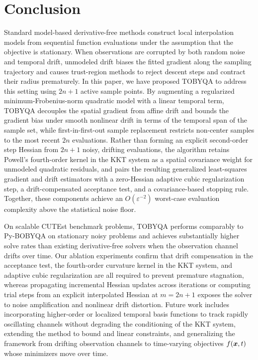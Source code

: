 \section{Conclusion}
\label{sec:conclusion}

Standard model-based derivative-free methods construct local interpolation models from sequential function evaluations under the assumption that the objective is stationary. When observations are corrupted by both random noise and temporal drift, unmodeled drift biases the fitted gradient along the sampling trajectory and causes trust-region methods to reject descent steps and contract their radius prematurely. In this paper, we have proposed TOBYQA to address this setting using $2n+1$ active sample points. By augmenting a regularized minimum-Frobenius-norm quadratic model with a linear temporal term, TOBYQA decouples the spatial gradient from affine drift and bounds the gradient bias under smooth nonlinear drift in terms of the temporal span of the sample set, while first-in-first-out sample replacement restricts non-center samples to the most recent $2n$ evaluations. Rather than forming an explicit second-order step Hessian from $2n+1$ noisy, drifting evaluations, the algorithm retains Powell's fourth-order kernel in the KKT system as a spatial covariance weight for unmodeled quadratic residuals, and pairs the resulting generalized least-squares gradient and drift estimators with a zero-Hessian adaptive cubic regularization step, a drift-compensated acceptance test, and a covariance-based stopping rule. Together, these components achieve an $O(\varepsilon^{-2})$ worst-case evaluation complexity above the statistical noise floor.

On scalable CUTEst benchmark problems, TOBYQA performs comparably to Py-BOBYQA on stationary noisy problems and achieves substantially higher solve rates than existing derivative-free solvers when the observation channel drifts over time. Our ablation experiments confirm that drift compensation in the acceptance test, the fourth-order curvature kernel in the KKT system, and adaptive cubic regularization are all required to prevent premature stagnation, whereas propagating incremental Hessian updates across iterations or computing trial steps from an explicit interpolated Hessian at $m = 2n+1$ exposes the solver to noise amplification and nonlinear drift distortion. Future work includes incorporating higher-order or localized temporal basis functions to track rapidly oscillating channels without degrading the conditioning of the KKT system, extending the method to bound and linear constraints, and generalizing the framework from drifting observation channels to time-varying objectives $f(\boldsymbol{x}, t)$ whose minimizers move over time.
